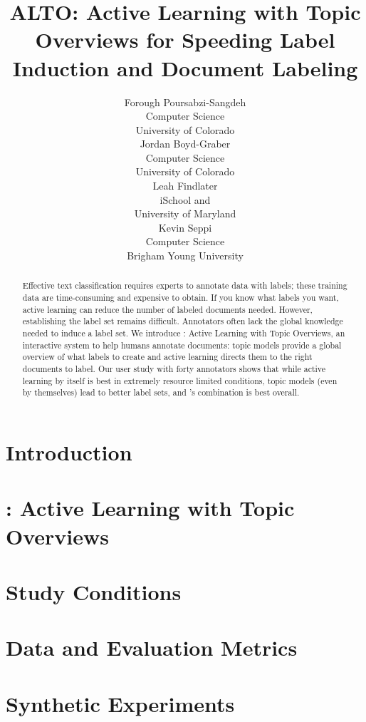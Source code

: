 \documentclass[11pt]{article}
\title{ALTO: Active Learning with Topic Overviews for Speeding Label Induction and Document Labeling}
\author{Forough Poursabzi-Sangdeh \\
              Computer Science \\
	     University of Colorado\\
	    \smalltt{forough.poursabzisangdeh@colorado.edu} 
	\And
	Jordan Boyd-Graber \\
              Computer Science \\
	     University of Colorado\\
	    \smalltt{Jordan.Boyd.Graber@colorado.edu}\protect
	 \AND
	 Leah Findlater\\
         iSchool and \abr{umiacs} \\
	 University of Maryland\\
	\smalltt{leahkf@umd.edu}
	\And
	Kevin Seppi \\
         Computer Science \\
	 Brigham Young University\\
	\smalltt{kseppi@cs.byu.edu}
	}
\newcommand{\name}[0]{\abr{alto}}
\begin{document}
\maketitle

\begin{abstract}
  Effective text classification requires experts to annotate data with
  labels; these training data are time-consuming and expensive to
  obtain. If you know what labels you want, active learning can reduce
  the number of labeled documents needed.  However, establishing the label
  set remains difficult. Annotators often lack the global knowledge
  needed to induce a label set.  We introduce \name{}: Active Learning
  with Topic Overviews, an interactive system to help humans annotate
  documents: topic models provide a global overview of what labels to
  create and active learning directs them to the right documents to
  label.  Our user study with forty annotators shows that while active
  learning by itself is best in extremely resource limited conditions,
  topic models (even by themselves) lead to better label sets, and
  \name{}'s combination is best overall.
\end{abstract}

\section{Introduction}
\label{sec:introduction} 

\section{\name{}: Active Learning with Topic Overviews}
\label{sec:ALTO} 

\section{Study Conditions}
\label{sec:conditions} 

\section{Data and Evaluation Metrics}
\label{sec:data_metrics} 

\section{Synthetic Experiments}
\label{sec:synthetic_exp}
\end{document}

